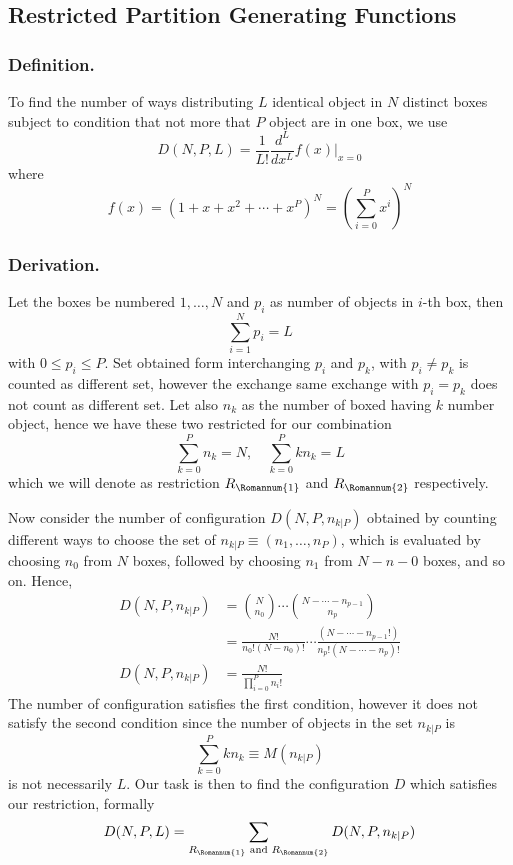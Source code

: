 \documentclass[../../main.tex]{subfiles}
\begin{document}
\subsection*{Restricted Partition Generating Functions}
\subsubsection*{Definition.} To find the number of ways distributing $L$ identical object in $N$ distinct boxes subject to condition that not more that $P$ object are in one box, we use 
\begin{equation*}
    D(N,P,L)=\frac{1}{L!}\frac{d^L}{dx^L}f(x)\bigg|_{x=0}
\end{equation*}
where
\begin{equation*}
    f(x)=\left(1+x+x^2+\cdots+ x^P\right)^N=\left(\sum^{P }_{i=0}x^i\right)^N
\end{equation*}

\subsubsection*{Derivation.} Let the boxes be numbered $1,\dots, N$ and $p_i$ as number of objects in $i$-th box, then 
\begin{equation*}
    \sum_{i=1}^{N}p_i=L
\end{equation*}
with $0\leq p_i\leq P$. Set obtained form interchanging $p_i$ and $p_k$, with $p_i\neq p_k$ is counted as different set, however the exchange same exchange with $p_i=p_k$ does not count as different set. Let also $n_k$ as the number of boxed having $k$ number object, hence we have these two restricted for our combination
\begin{equation*}
    \sum_{k=0}^{P}n_k=N,\quad\sum_{k=0 }^{P }kn_k=L
\end{equation*}
which we will denote as restriction $R_\Romannum{1}$ and $R_\Romannum{2}$ respectively.

Now consider the number of configuration $D(N,P,n_{k|P})$ obtained by counting different ways to choose the set of $n_{k|P}\equiv(n_1,\dots,n_P)$, which is evaluated by choosing $n_0$ from $N$ boxes, followed by choosing $n_1$ from $N-n-0$ boxes, and so on. Hence,
\begin{align*}
    D(N,P,n_{k|P})&={N\choose n_0}\cdots{N-\cdots-n_{p-1} \choose n_p}\\
    &=\frac{N!}{n_0!(N-n_0)!}\cdots \frac{(N-\cdots-n_{p-1}!)}{n_p!(N-\cdots-n_p)!}\\
    D(N,P,n_{k|P})&=\frac{N!}{\displaystyle\prod_{i=0}^{P}n_i!}
\end{align*} 
The number of configuration satisfies the first condition, however it does not satisfy the second condition since the number of objects in the set $n_{k|P}$ is 
\begin{equation*}
    \sum_{k=0}^{P }kn_k\equiv M(n_{k|P})
\end{equation*}
is not necessarily $L$. Our task is then to find the configuration $D$ which satisfies our restriction, formally 
\begin{equation*}
    D(N,P,L)=\sum_{R_\Romannum{1}\text{ and }R_\Romannum{2}}D(N,P,n_{k|P})
\end{equation*}
\end{document}
